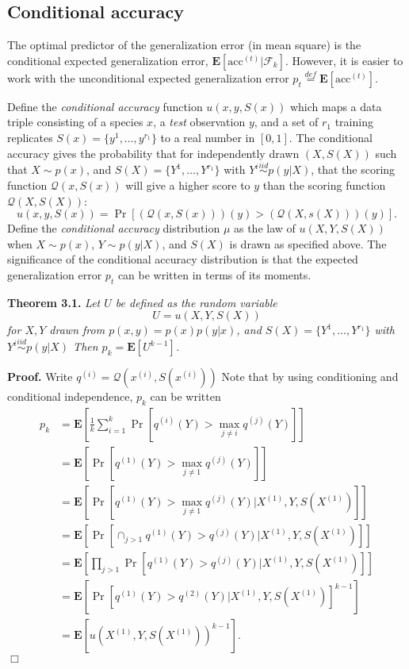 \documentclass{article}
\newcommand{\E}{\textbf{E}}
\begin{document}
\subsection{Conditional accuracy}

The optimal predictor of the generalization error (in mean square) is
the conditional expected generalization error,
$\E[\text{acc}^{(t)}|\mathcal{F}_k]$.  However, it is easier to work with the
unconditional expected generalization error $p_t \stackrel{def}{=}
\E[\text{acc}^{(t)}]$.

Define the \emph{conditional accuracy} function $u(x, y, S(x))$ which
maps a data triple consisting of a species $x$, a \emph{test}
observation $y$, and a set of $r_1$ training replicates $S(x) =
\{y^{1}, \hdots, y^{r_1}\}$ to a real number in $[0,1]$.  The
conditional accuracy gives the probability that for independently
drawn $(X, S(X))$ such that $X \sim p(x)$, and $S(X) = \{Y^1,\hdots,
Y^{r_1}\}$ with $Y^i \stackrel{iid}{\sim} p(y|X)$, that the scoring
function $\mathcal{Q}(x, S(x))$ will give a higher score to $y$ than
the scoring function $\mathcal{Q}(X, S(X))$:
\[
u(x, y, S(x)) = \Pr[(\mathcal{Q}(x, S(x)))(y) > (\mathcal{Q}(X, s(X)))(y)].
\]
Define the \emph{conditional accuracy} distribution $\mu$ as the law of
$u(X, Y, S(X))$ when $X \sim p(x)$, $Y\sim p(y|X)$, and $S(X)$ is
drawn as specified above.  The significance of the conditional
accuracy distribution is that the expected generalization error $p_t$
can be written in terms of its moments.

\noindent\textbf{Theorem 3.1.} \emph{
Let $U$ be defined as the random variable
\[U = u(X, Y, S(X))\]
for $X, Y$ drawn from $p(x, y) = p(x) p(y|x)$,
and $S(X) = \{Y^1,\hdots, Y^{r_1}\}$ with $Y^i \stackrel{iid}{\sim} p(y|X)$
Then $p_k = \E[U^{k-1}]$.
}

\noindent\textbf{Proof.}  
Write $q^{(i)} = \mathcal{Q}(x^{(i)}, S(x^{(i)}))$
Note that by using conditioning and
conditional independence, $p_k$ can be written
\begin{align*}
p_k &= \E\left[ \frac{1}{k}\sum_{i=1}^k  \Pr[q^{(i)}(Y) > \max_{j\neq i} q^{(j)}(Y)] \right]
\\&= \E\left[ \Pr[q^{(1)}(Y) > \max_{j\neq 1} q^{(j)}(Y)] \right]
\\&= \E[\Pr[q^{(1)}(Y) > \max_{j\neq 1} q^{(j)}(Y)|X^{(1)}, Y, S(X^{(1)})]]
\\&= \E[\Pr[\cap_{j > 1} q^{(1)}(Y) > q^{(j)}(Y)|X^{(1)}, Y, S(X^{(1)})]]
\\&= \E[\prod_{j > 1}\Pr[q^{(1)}(Y) > q^{(j)}(Y)|X^{(1)}, Y, S(X^{(1)})]]
\\&= \E[\Pr[q^{(1)}(Y) > q^{(2)}(Y)|X^{(1)}, Y, S(X^{(1)})]^{k-1}]
\\&= \E[u(X^{(1)}, Y, S(X^{(1)}))^{k-1}].
\end{align*}
$\Box$
\end{document}
